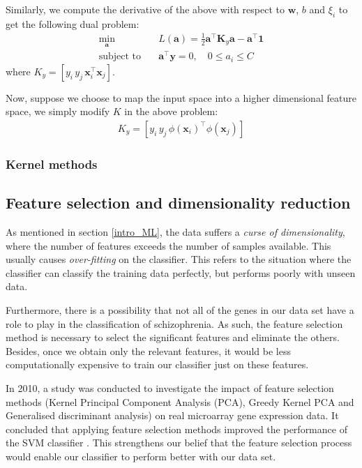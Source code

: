\documentclass[12pt, twoside, a4paper]{article}
\def\vec{\boldsymbol}
\begin{document}
Similarly, we compute the derivative of the above with respect to $\vec{w}$, $b$ and $\xi_i$ to get the following dual problem:
\begin{align*}
\min_{\vec{a}} \quad &L(\vec{a}) = \frac{1}{2}\vec{a}^\top \vec{K}_y \vec{a} - \vec{a}^\top \vec{1} \\
\text{subject to} \quad &\vec{a}^\top \vec{y} = 0, \quad 0 \leq a_i \leq C
\end{align*}
where $K_y = [y_i \, y_j \, \vec{x}_i^\top \vec{x}_j]$.

Now, suppose we choose to map the input space into a higher dimensional feature space, we simply modify $K$ in the above problem:
\begin{align*}
K_y = [y_i \, y_j \, \phi(\vec{x}_i)^\top \phi(\vec{x}_j)]
\end{align*}

\subsubsection{Kernel methods}

\subsection{Feature selection and dimensionality reduction} \label{bg_feature_selection}
As mentioned in section \ref{intro_ML}, the data suffers a \textit{curse of dimensionality}, where the number of features exceeds the number of samples available. This usually causes \textit{over-fitting} on the classifier. This refers to the situation where the classifier can classify the training data perfectly, but performs poorly with unseen data.

Furthermore, there is a possibility that not all of the genes in our data set have a role to play in the classification of schizophrenia. As such, the feature selection method is necessary to select the significant features and eliminate the others. Besides, once we obtain only the relevant features, it would be less computationally expensive to train our classifier just on these features.

In 2010, a study was conducted to investigate the impact of feature selection methods (Kernel Principal Component Analysis (PCA), Greedy Kernel PCA and Generalised discriminant analysis) on real microarray gene expression data. It concluded that applying feature selection methods improved the performance of the SVM classifier \cite{RefWorks:115}. This strengthens our belief that the feature selection process would enable our classifier to perform better with our data set.
\end{document}
